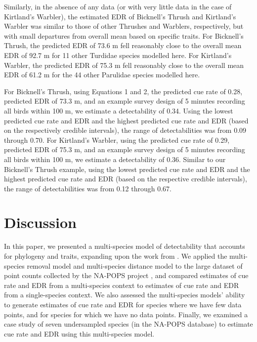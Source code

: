 \documentclass[12pt]{article}
\begin{document}
\par Similarly, in the absence of any data (or with very little data in the case of Kirtland’s Warbler), the estimated EDR of Bicknell’s Thrush and Kirtland’s Warbler was similar to those of other Thrushes and Warblers, respectively, but with small departures from overall mean based on specific traits.
For Bicknell's Thrush, the predicted EDR of 73.6 m fell reasonably close to the overall mean EDR of 92.7 m for 11 other Turdidae species modelled here.
For Kirtland's Warbler, the predicted EDR of 75.3 m fell reasonably close to the overall mean EDR of 61.2 m for the 44 other Parulidae species modelled here.

\par For Bicknell's Thrush, using Equations 1 and 2, the predicted cue rate of 0.28, predicted EDR of 73.3 m, and an example survey design of 5 minutes recording all birds within 100 m, we estimate a detectability of 0.34.
Using the lowest predicted cue rate and EDR and the highest predicted cue rate and EDR (based on the respectively credible intervals), the range of detectabilities was from 0.09 through 0.70.
For Kirtland’s Warbler, using the predicted cue rate of 0.29, predicted EDR of 75.3 m, and an example survey design of 5 minutes recording all birds within 100 m, we estimate a detectability of 0.36.
Similar to our Bicknell’s Thrush example, using the lowest predicted cue rate and EDR and the highest predicted cue rate and EDR (based on the respective credible intervals), the range of detectabilities was from 0.12 through 0.67.


\section{Discussion}

\par In this paper, we presented a multi-species model of detectability that accounts for phylogeny and traits, expanding upon the work from \citet{solymos_phylogeny_2018}.
We applied the multi-species removal model and multi-species distance model to the large dataset of point counts collected by the NA-POPS project \citep{edwards_point_2023}, and compared estimates of cue rate and EDR from a multi-species context to estimates of cue rate and EDR from a single-species context.
We also assessed the multi-species models' ability to generate estimates of cue rate and EDR for species where we have few data points, and for species for which we have no data points.
Finally, we examined a case study of seven undersampled species (in the NA-POPS database) to estimate cue rate and EDR using this multi-species model.
\end{document}
